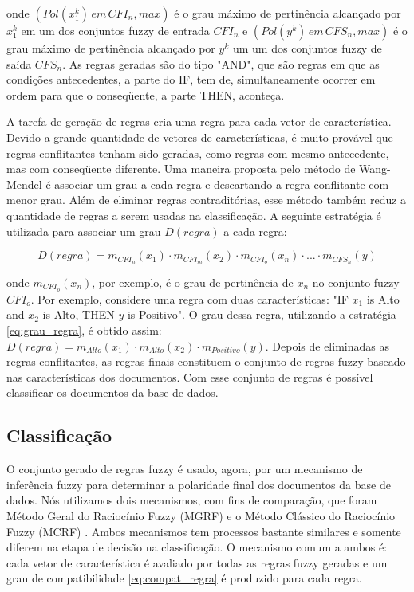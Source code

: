 onde $(Pol(x_1^k) \, em \, CFI_n, max)$ é o grau máximo de pertinência alcançado por $x_1^k$ em um dos conjuntos fuzzy de entrada $CFI_n$ e $(Pol(y^k) \, em \, CFS_n, max)$ é o grau máximo de pertinência alcançado por $y^k$ um um dos conjuntos fuzzy de saída $CFS_n$. As regras geradas são do tipo "AND", que são regras em que as condições antecedentes, a parte do IF, tem de, simultaneamente ocorrer em ordem para que o conseqüente, a parte THEN, aconteça. 

A tarefa de geração de regras cria uma regra para cada vetor de característica. Devido a grande quantidade de vetores de características, é muito provável que regras conflitantes tenham sido geradas, como regras com mesmo antecedente, mas com conseqüente diferente. Uma maneira proposta pelo método de Wang-Mendel é associar um grau a cada regra e descartando a regra conflitante com menor grau. Além de eliminar regras contraditórias, esse método também reduz a quantidade de regras a serem usadas na classificação. A seguinte estratégia é utilizada para associar um grau $D(regra)$ a cada regra: 

\begin{equation}
D(regra) = m_{CFI_n}(x_1) \cdot m_{CFI_m}(x_2) \cdot m_{CFI_o}(x_n) \cdot ... \cdot m_{CFS_n}(y)
\label{eq:grau_regra}
\end{equation}

onde $m_{CFI_o}(x_n)$, por exemplo, é o grau de pertinência de $x_n$ no conjunto fuzzy $CFI_o$. Por exemplo, considere uma regra com duas características: "IF $x_1$ is Alto and $x_2$ is Alto, THEN $y$ is Positivo". O grau dessa regra, utilizando a estratégia \ref{eq:grau_regra}, é obtido assim:  $D(regra) = m_{Alto}(x_1) \cdot m_{Alto}(x_2) \cdot m_{Positivo}(y)$. Depois de eliminadas as regras conflitantes, as regras finais constituem o conjunto de regras fuzzy baseado nas características dos documentos. Com esse conjunto de regras é possível classificar os documentos da base de dados.

\subsection{Classificação}

O conjunto gerado de regras fuzzy é usado, agora, por um mecanismo de inferência fuzzy para determinar a polaridade final dos documentos da base de dados. Nós utilizamos dois mecanismos, com fins de comparação, que foram Método Geral do Raciocínio Fuzzy (MGRF) e o Método Clássico do Raciocínio Fuzzy (MCRF) \cite{cordon1999proposal}.
Ambos mecanismos tem processos bastante similares e somente diferem na etapa de decisão na classificação. O mecanismo comum a ambos é: cada vetor de característica é avaliado por todas as regras fuzzy geradas e um grau de compatibilidade \ref{eq:compat_regra} é produzido para cada regra. 


